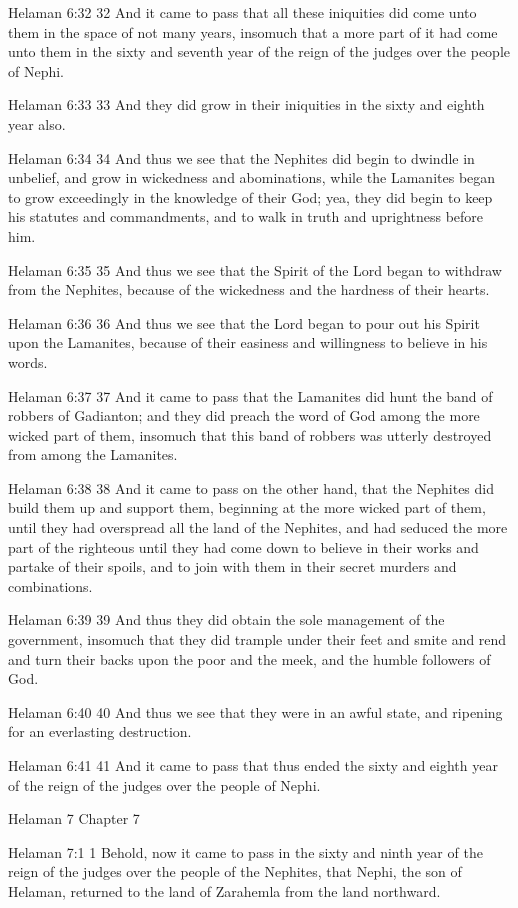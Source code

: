 Helaman 6:32
 32 And it came to pass that all these iniquities did come unto
them in the space of not many years, insomuch that a more part of
it had come unto them in the sixty and seventh year of the reign
of the judges over the people of Nephi.

Helaman 6:33
 33 And they did grow in their iniquities in the sixty and eighth
year also.

Helaman 6:34
 34 And thus we see that the Nephites did begin to dwindle in
unbelief, and grow in wickedness and abominations, while the
Lamanites began to grow exceedingly in the knowledge of their
God; yea, they did begin to keep his statutes and commandments,
and to walk in truth and uprightness before him.

Helaman 6:35
 35 And thus we see that the Spirit of the Lord began to withdraw
from the Nephites, because of the wickedness and the hardness of
their hearts.

Helaman 6:36
 36 And thus we see that the Lord began to pour out his Spirit
upon the Lamanites, because of their easiness and willingness to
believe in his words.

Helaman 6:37
 37 And it came to pass that the Lamanites did hunt the band of
robbers of Gadianton; and they did preach the word of God among
the more wicked part of them, insomuch that this band of robbers
was utterly destroyed from among the Lamanites.

Helaman 6:38
 38 And it came to pass on the other hand, that the Nephites did
build them up and support them, beginning at the more wicked part
of them, until they had overspread all the land of the Nephites,
and had seduced the more part of the righteous until they had
come down to believe in their works and partake of their spoils,
and to join with them in their secret murders and combinations.

Helaman 6:39
 39 And thus they did obtain the sole management of the
government, insomuch that they did trample under their feet and
smite and rend and turn their backs upon the poor and the meek,
and the humble followers of God.

Helaman 6:40
 40 And thus we see that they were in an awful state, and
ripening for an everlasting destruction.

Helaman 6:41
 41 And it came to pass that thus ended the sixty and eighth year
of the reign of the judges over the people of Nephi.

Helaman 7
Chapter 7

Helaman 7:1
 1 Behold, now it came to pass in the sixty and ninth year of the
reign of the judges over the people of the Nephites, that Nephi,
the son of Helaman, returned to the land of Zarahemla from the
land northward.

